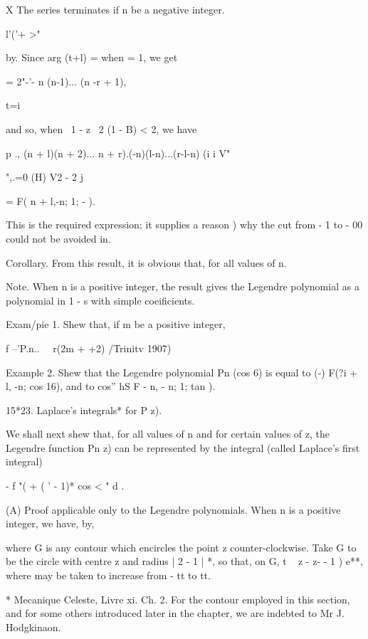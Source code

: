 {{X The series terminates if n be a negative integer.

l'('+ >"

%
%

by. Since arg (t+l) = when = 1, we get

= 2"-'- n (n-1)... (n -r + 1),

t=i

and so, when \ 1 - z \ 2 (1 - B) < 2, we have

p ., (n + l)(n + 2)... n + r).(-n)(l-n)...(r-l-n) (i i V"

   ",.=0 (H) V2 - 2 j

= F( n + l,-n; 1; - ).

This is the required expression; it supplies a reason ) why
the cut from - 1 to - 00 could not be avoided in.

Corollary. From this result, it is obvious that, for all values of n.

Note. When n is a positive integer, the result gives the Legendre
polynomial as a polynomial in 1 - s with simple coeificients.

Exam/pie 1. Shew that, if m be a positive integer,

f --'P.n.. \ \ r(2m + +2) /Trinitv 1907)

Example 2. Shew that the Legendre polynomial Pn (cos 6) is equal to
(-) F(?i + l, -n; \; cos 16), and to cos'' hS F - n, - n; 1; tan ).

15*23. Laplace's integrals* for P z).

We shall next shew that, for all values of n and for certain values of
z, the Legendre function Pn z) can be represented by the integral
(called Laplace's first integral)

- f "( + ( ' - 1)* cos < " d .

(A) Proof applicable only to the Legendre polynomials. When n is a
positive integer, we have, by,

where G is any contour which encircles the point z counter-clockwise.
Take G to be the circle with centre z and radius | 2 - 1 | *, so that,
on G, t ~ z - z- - 1 ) e**, where may be taken to increase from - tt
to tt.

* Mecanique Celeste, Livre xi. Ch. 2. For the contour employed in this
section, and for some others introduced later in the chapter, we are
indebted to Mr J. Hodgkinaon.

%
%

}}
